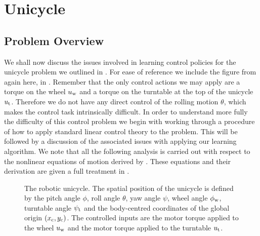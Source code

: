 %
%





\section{Unicycle}
\subsection{Problem Overview}
We shall now discuss the issues involved in learning control policies for the unicycle problem we outlined in . For ease of reference we include the figure from  again here, in . Remember that the only control actions we may apply are a torque on the wheel $u_{\text{w}}$ and a torque on the turntable at the top of the unicycle $u_{\text{t}}$. Therefore we do not have any direct control of the rolling motion $\theta$, which makes the control task intrinsically difficult. In order to understand more fully the difficulty of this control problem we begin with working through a procedure of how to apply standard linear control theory to the problem. This will be followed by a discussion of the associated issues with applying our learning algorithm. We note that all the following analysis is carried out with respect to the nonlinear equations of motion derived by \cite{For09}. These equations and their derivation are given a full treatment in .




\begin{figure}[t]
\centering

\caption{The robotic unicycle. The spatial position of the unicycle is defined by the pitch angle $\phi$, roll angle $\theta$, yaw angle $\psi$, wheel angle $\phi_{\text{w}}$, turntable angle $\psi_{\text{t}}$ and the body-centred coordinates of the global origin $(x_{\text{c}},y_{\text{c}})$. The controlled inputs are the motor torque applied to the wheel $u_{\text{w}}$ and the motor torque applied to the turntable $u_{\text{t}}$.}
\label{fig:uniboy}
\end{figure}



